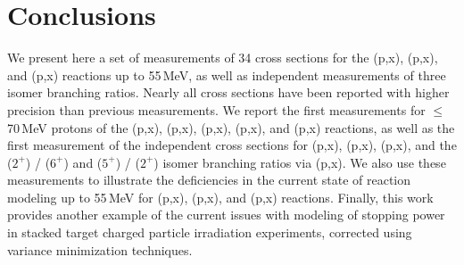 % 
% 
% 





 
 \section{\label{sec:conclusions_fe}Conclusions}
 

We present here a set of measurements of 34 cross sections for the (p,x), (p,x), and  (p,x) reactions up to 55\,MeV, as well as  independent measurements of three isomer branching ratios.
Nearly all cross sections have been reported with higher precision than previous measurements.
We report the first measurements  for $\leq$70\,MeV protons  of the  (p,x), (p,x), (p,x),  (p,x), and (p,x) reactions, as well as the first measurement of the independent cross sections for    (p,x), (p,x), (p,x), and the  ($2^+$) /   ($6^+$) and  ($5^+$) /   ($2^+$)  isomer branching ratios via (p,x).
We also use these measurements to illustrate the deficiencies in the current state of  reaction modeling up to 55\,MeV for  (p,x), (p,x), and  (p,x) reactions.
Finally, this work provides another example of the current issues with modeling of  stopping power in stacked target charged particle irradiation experiments, corrected using variance minimization techniques.  



